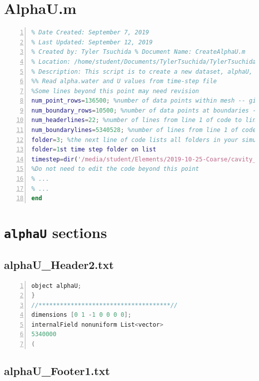 \section*{AlphaU.m}

\begin{lstlisting}[language=Matlab,numbers=left,basicstyle={\ttfamily},breaklines=true,showspaces=true]
% Create Alpha-U Data Set
% Date Created: September 7, 2019
% Last Updated: September 12, 2019
% Created by: Tyler Tsuchida % Document Name: CreateAlphaU.m
% Location: /home/student/Documents/TylerTsuchida/TylerTsuchidaThesis/
% Description: This script is to create a new dataset, alphaU, for every timestep in an openFOAM simulation
%% Read alpha.water and U values from time-step file
%Some lines beyond this point may need revision
num_point_rows=136500; %number of data points within mesh -- given after U or alphawater header
num_boundary_rows=10500; %number of data points at boundaries -- given after boundary conditions are stated at end of U or alphawater
num_headerlines=22; %number of lines from line 1 of code to line before mes data is written
num_boundarylines=5340528; %number of lines from line 1 of code to line before boundary data is written
folder=3; %the next line of code lists all folders in your simulation directory, to skip invisible folders,
folder=1st time step folder on list
timestep=dir('/media/student/Elements/2019-10-25-Coarse/cavity_cFE_coarse0/cavity_cFE_coarse0'); %insert directory with all timesteps here
%Do not need to edit the code beyond this point
% ...
% ...
end
\end{lstlisting}


\section*{\texttt{alphaU} sections}

\subsection*{alphaU\_Header2.txt}

\begin{lstlisting}[language={C++},numbers=left,basicstyle={\ttfamily}]
object alphaU;
}
//*************************************//
dimensions [0 1 -1 0 0 0 0];
internalField nonuniform List<vector>
5340000
(
\end{lstlisting}


\subsection*{alphaU\_Footer1.txt}

